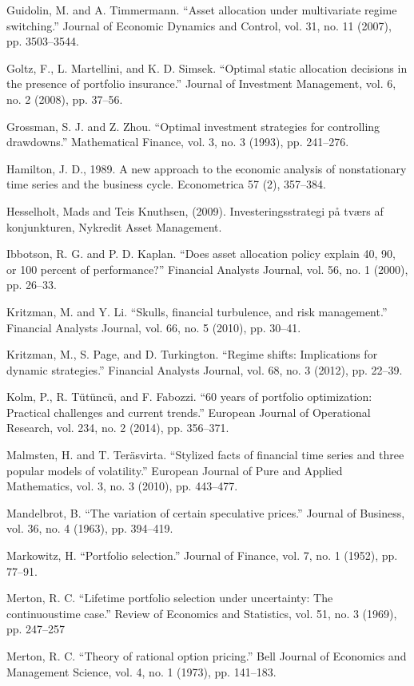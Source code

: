 Guidolin, M. and A. Timmermann. “Asset allocation under multivariate regime switching.” Journal of Economic Dynamics and Control, vol. 31, no. 11 (2007), pp. 3503–3544.

Goltz, F., L. Martellini, and K. D. Simsek. “Optimal static allocation decisions
in the presence of portfolio insurance.” Journal of Investment Management,
vol. 6, no. 2 (2008), pp. 37–56.

Grossman, S. J. and Z. Zhou. “Optimal investment strategies for controlling
drawdowns.” Mathematical Finance, vol. 3, no. 3 (1993), pp. 241–276.

Hamilton, J. D., 1989. A new approach to the economic analysis of nonstationary time series and the business cycle. Econometrica 57 (2), 357–384.

Hesselholt, Mads and Teis Knuthsen, (2009). Investeringsstrategi på tværs af konjunkturen, Nykredit Asset Management.

Ibbotson, R. G. and P. D. Kaplan. “Does asset allocation policy explain 40, 90, or 100 percent of performance?” Financial Analysts Journal, vol. 56, no. 1 (2000), pp. 26–33.

Kritzman, M. and Y. Li. “Skulls, financial turbulence, and risk management.” Financial Analysts Journal, vol. 66, no. 5 (2010), pp. 30–41.

Kritzman, M., S. Page, and D. Turkington. “Regime shifts: Implications for dynamic strategies.” Financial Analysts Journal, vol. 68, no. 3 (2012), pp. 22–39.

Kolm, P., R. Tütüncü, and F. Fabozzi. “60 years of portfolio optimization: Practical challenges and current trends.” European Journal of Operational Research, vol. 234, no. 2 (2014), pp. 356–371.

Malmsten, H. and T. Teräsvirta. “Stylized facts of financial time series and three popular models of volatility.” European Journal of Pure and Applied Mathematics, vol. 3, no. 3 (2010), pp. 443–477.

Mandelbrot, B. “The variation of certain speculative prices.” Journal of Business, vol. 36, no. 4 (1963), pp. 394–419.

Markowitz, H. “Portfolio selection.” Journal of Finance, vol. 7, no. 1 (1952), pp. 77–91.

Merton, R. C. “Lifetime portfolio selection under uncertainty: The continuoustime case.” Review of Economics and Statistics, vol. 51, no. 3 (1969), pp. 247–257

Merton, R. C. “Theory of rational option pricing.” Bell Journal of Economics and Management Science, vol. 4, no. 1 (1973), pp. 141–183.

